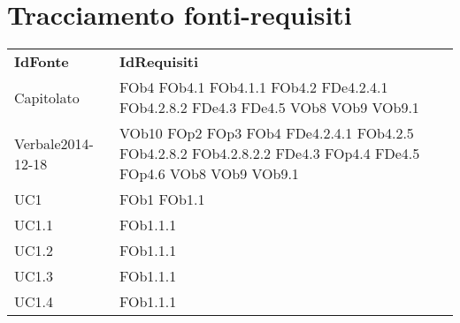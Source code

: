 \section{Tracciamento fonti-requisiti}
\begin{longtable}{|l|p{4cm}|}
\hline
\textbf{IdFonte} & \textbf{IdRequisiti} \\ 
Capitolato & FOb4 \linebreak  FOb4.1 \linebreak  FOb4.1.1 \linebreak  FOb4.2 \linebreak  FDe4.2.4.1 \linebreak  FOb4.2.8.2 \linebreak  FDe4.3 \linebreak  FDe4.5 \linebreak  VOb8 \linebreak  VOb9 \linebreak  VOb9.1 \linebreak   \\ 
\hline
		Verbale2014-12-18 & VOb10 \linebreak  FOp2 \linebreak  FOp3 \linebreak  FOb4 \linebreak  FDe4.2.4.1 \linebreak  FOb4.2.5 \linebreak  FOb4.2.8.2 \linebreak  FOb4.2.8.2.2 \linebreak  FDe4.3 \linebreak  FOp4.4 \linebreak  FDe4.5 \linebreak  FOp4.6 \linebreak  VOb8 \linebreak  VOb9 \linebreak  VOb9.1 \linebreak   \\
\hline
		UC1 & FOb1 \linebreak  FOb1.1 \linebreak   \\
\hline
		UC1.1 & FOb1.1.1 \linebreak   \\
\hline
		UC1.2 & FOb1.1.1 \linebreak   \\
\hline
		UC1.3 & FOb1.1.1 \linebreak   \\
\hline
		UC1.4 & FOb1.1.1 \linebreak   \\

\end{longtable}
